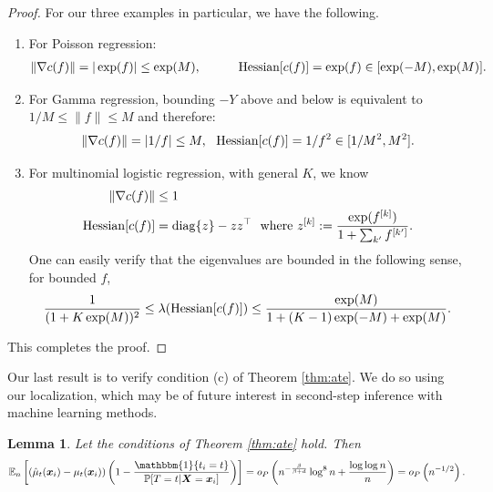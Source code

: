 \documentclass[11pt]{article}
\newtheorem{lemma}{Lemma}
\numberwithin{equation}{section}
\theoremstyle{definition}
\newcommand{\E}{\mathbb{E}}
\renewcommand{\P}{\mathbb{P}}
\newcommand{\One}{\mathbbm{1}}
\newcommand{\bx}{\bm{x}}
\newcommand{\bX}{\bm{X}}
\begin{document}
\begin{appendices}
\begin{proof}
	For our three examples in particular, we have the following.
	\begin{enumerate}
		\item For Poisson regression:
		\begin{align*}
			\| \nabla c(f) \| = | \exp(f)| \leq \exp(M), \qquad \quad {\rm Hessian}[c(f)] = \exp(f) \in [\exp(-M), \exp(M)].
		\end{align*}
		
		\item For Gamma regression, bounding $-Y$ above and below is equivalent to $1/M \leq \| f \| \leq M$ and therefore:
		\begin{align*}
			\| \nabla c(f) \| = | 1/f| \leq M,~~{\rm Hessian}[c(f)] = 1/f^2 \in [1/M^2, M^2].  
		\end{align*} 
		
		\item For multinomial logistic regression, with general $K$, we know
	\begin{align*}
		\| \nabla c(f) \| &\leq 1 \\
		{\rm Hessian}[c(f)] &= {\rm diag}\{ z \} - z z^\top ~~\text{where}~ z^{[k]}:=\frac{\exp(f^{[k]})}{1+\sum_{k'} f^{[k']}}.
	\end{align*}
	One can easily verify that the eigenvalues are bounded in the following sense, for bounded $f$,
	\begin{align*}
		\frac{1}{(1+K\exp(M))^2} \leq \lambda({\rm Hessian}[c(f)]) \leq \frac{\exp(M)}{1+(K-1)\exp(-M)+\exp(M)}.
	\end{align*}

	\end{enumerate}
	
	This completes the proof.
\end{proof}



Our last result is to verify condition (c) of Theorem \ref{thm:ate}. We do so using our localization, which may be of future interest in second-step inference with machine learning methods.
\begin{lemma}
	\label{lem:logit}
	Let the conditions of Theorem \ref{thm:ate} hold. Then 
	\[
		\E_n\left[ (\hat{\mu}_t(\bx_i) - \mu_t(\bx_i)) \left(1 - \frac{\One\{t_i=t\} }{ \P[T=t\vert\bX = \bx_i]}\right)\right]   = o_P \left( n^{-\frac{\beta}{\beta+d}} \log^8 n + \frac{\log \log n}{n} \right)  = o_P\left(n^{-1/2}\right).
	\]
\end{lemma}



\end{appendices}
\end{document}

